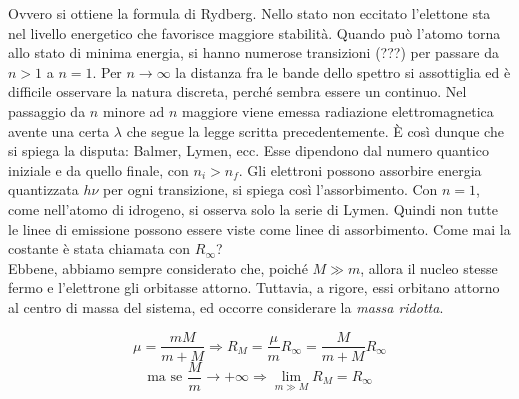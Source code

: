 Ovvero si ottiene la formula di Rydberg.
Nello stato non eccitato l'elettone sta nel livello energetico che favorisce maggiore stabilità.
Quando può l'atomo torna allo stato di minima energia, si hanno numerose transizioni (???) per passare da $n>1$ a $n=1$.
Per $n \rightarrow \infty$ la distanza fra le bande dello spettro si assottiglia ed è difficile osservare la natura discreta, perché sembra essere un continuo.
Nel passaggio da $n$ minore ad $n$ maggiore viene emessa radiazione elettromagnetica avente una certa $\lambda$ che segue la legge scritta precedentemente.
È così dunque che si spiega la disputa: Balmer, Lymen, ecc. 
Esse dipendono dal numero quantico iniziale e da quello finale, con $n_i > n_f $.
Gli elettroni possono assorbire energia quantizzata $h\nu$ per ogni transizione, si spiega così l'assorbimento.
Con $n=1$, come nell'atomo di idrogeno, si osserva solo la serie di Lymen.
Quindi non tutte le linee di emissione possono essere viste come linee di assorbimento.
Come mai la costante è stata chiamata con $R_{\infty}$? \\
Ebbene, abbiamo sempre considerato che, poiché $M \gg m$, allora il nucleo stesse fermo e l'elettrone gli orbitasse attorno.
Tuttavia, a rigore, essi orbitano attorno al centro di massa del sistema, ed occorre considerare la \textit{massa ridotta}.

$$ \mu = \frac{m M}{m + M} \Rightarrow R_M =\frac{\mu}{m} R_{\infty} = \frac{M}{m + M} R_{\infty} $$
$$ \mbox{ma se  } \frac{M}{m} \rightarrow +\infty \Rightarrow  \lim_{m \gg M} R_M = R_{\infty}  $$


